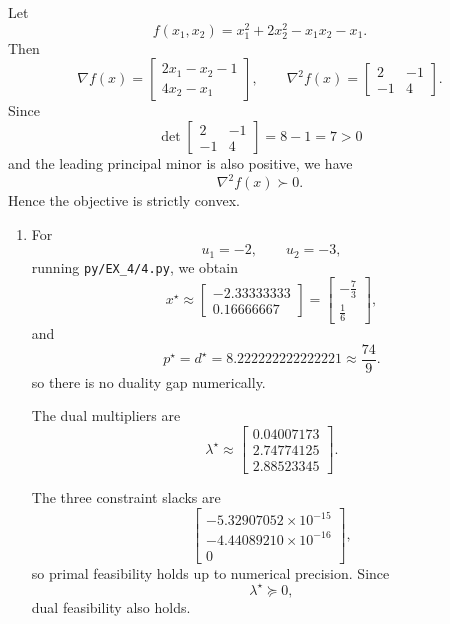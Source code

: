 \documentclass[11pt,letter,notitlepage]{article}
\theoremstyle{definition}
\begin{document}
\newpage

\begin{solution}
Let
\[
f(x_1,x_2)=x_1^2+2x_2^2-x_1x_2-x_1.
\]
Then
\[
\nabla f(x)=
\begin{bmatrix}
2x_1-x_2-1\\
4x_2-x_1
\end{bmatrix},
\qquad
\nabla^2 f(x)=
\begin{bmatrix}
2 & -1\\
-1 & 4
\end{bmatrix}.
\]
Since
\[
\det
\begin{bmatrix}
2 & -1\\
-1 & 4
\end{bmatrix}
=8-1=7>0
\]
and the leading principal minor is also positive, we have
\[
\nabla^2 f(x)\succ 0.
\]
Hence the objective is strictly convex.

\begin{enumerate}[label=(\alph*)]

\item
For
\[
u_1=-2,\qquad u_2=-3,
\]
running \texttt{py/EX\_4/4.py}, we obtain
\[
x^\star \approx
\begin{bmatrix}
-2.33333333\\
0.16666667
\end{bmatrix}
=
\begin{bmatrix}
-\frac73\\
\frac16
\end{bmatrix},
\]
and
\[
p^\star=d^\star=8.222222222222221\approx\frac{74}{9}.
\]
so there is no duality gap numerically.

The dual multipliers are
\[
\lambda^\star \approx
\begin{bmatrix}
0.04007173\\
2.74774125\\
2.88523345
\end{bmatrix}.
\]

The three constraint slacks are
\[
\begin{bmatrix}
-5.32907052\times 10^{-15}\\
-4.44089210\times 10^{-16}\\
0
\end{bmatrix},
\]
so primal feasibility holds up to numerical precision. Since
\[
\lambda^\star \succeq 0,
\]
dual feasibility also holds.


\end{enumerate}
\end{solution}
\end{document}

